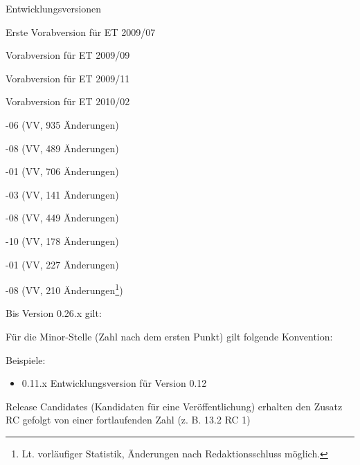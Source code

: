 \documentclass[
ngerman,
paper=a4,
asymmetric,
fontsize=10pt,
draft=false,
numbers=noenddot,
bibtotocnumbered,
footnotes=multiple,
toc=flat,
]{scrbook}
\begin{document}
\begin{compactdesc}
    \item[0.1.x] \dotfill Entwicklungsversionen
    \item[0.2.0] \dotfill Erste Vorabversion für ET 2009/07
    \item[0.4.0] \dotfill Vorabversion für ET 2009/09
    \item[0.6.0] \dotfill Vorabversion für ET 2009/11
    \item[0.8.0] \dotfill Vorabversion für ET 2010/02
    \item[0.10.0] -06 (VV, 935 Änderungen)
    \item[0.12.0] -08 (VV, 489 Änderungen)
    \item[0.14.0] -01 (VV, 706 Änderungen)
    \item[0.16.0] -03 (VV, 141 Änderungen)
    \item[0.18.0] -08 (VV, 449 Änderungen)
    \item[0.20] -10 (VV, 178 Änderungen)
    \item[0.22] -01 (VV, 227 Änderungen)
    \item[0.24] -08 (VV, 210
    Änderungen\footnote{Lt.
    vorläufiger Statistik, Änderungen nach Redaktionsschluss möglich.})
\end{compactdesc}

\Text
{Bis Version 0.26.x gilt: }
{%



Für die Minor-Stelle (Zahl nach dem ersten Punkt) gilt folgende Konvention:


Beispiele:

\begin{itemize}
  \item 0.11.x Entwicklungsversion für Version 0.12
\end{itemize}



Release Candidates (Kandidaten für eine Veröffentlichung) erhalten den Zusatz RC gefolgt von einer fortlaufenden Zahl (z. B. 13.2 RC 1) 
}
{}
{}
{}
{}
\end{document}
